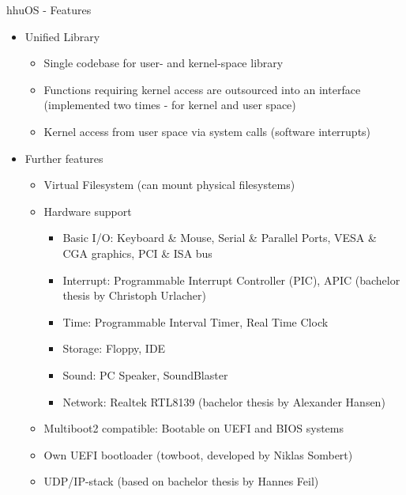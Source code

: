 	\begin{frame}{hhuOS - Features}
		\begin{itemize}
			\item Unified Library
			\begin{itemize}
				\item Single codebase for user- and kernel-space library
				\item Functions requiring kernel access are outsourced into an interface (implemented two times - for kernel and user space)
				\item Kernel access from user space via system calls (software interrupts)
			\end{itemize}
			\pause
			\item Further features
			\begin{itemize}
				\item Virtual Filesystem (can mount physical filesystems)
				\item Hardware support
					\begin{itemize}
						\item Basic I/O: Keyboard \& Mouse, Serial \& Parallel Ports, VESA \& CGA graphics, PCI \& ISA bus
						\item Interrupt: Programmable Interrupt Controller (PIC), APIC (bachelor thesis by Christoph Urlacher)
						\item Time: Programmable Interval Timer, Real Time Clock
						\item Storage: Floppy, IDE
						\item Sound: PC Speaker, SoundBlaster
						\item Network: Realtek RTL8139 (bachelor thesis by Alexander Hansen)
					\end{itemize}
				\item Multiboot2 compatible: Bootable on UEFI and BIOS systems
				\item Own UEFI bootloader (towboot, developed by Niklas Sombert)
				\item UDP/IP-stack (based on bachelor thesis by Hannes Feil)
			\end{itemize}	
		\end{itemize}
	\end{frame}